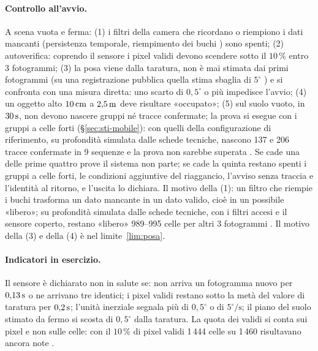 \paragraph{Controllo all'avvio.} A scena vuota e ferma: (1) i filtri della camera che ricordano o riempiono i dati mancanti (persistenza temporale, riempimento dei buchi \cite{realsense-filtri-post}) sono spenti; (2) autoverifica: coprendo il sensore i pixel validi devono scendere sotto il $10\,\%$ entro 3 fotogrammi; (3) la posa viene dalla taratura, non è mai stimata dai primi fotogrammi (su una registrazione pubblica \cite{tum-rgbd} quella stima sbaglia di $5^\circ$ ) e si confronta con una misura diretta: uno scarto di $0{,}5^\circ$ o più impedisce l'avvio; (4) un oggetto alto $10\,\mathrm{cm}$ a $2{,}5\,\mathrm{m}$ deve risultare «occupato»; (5) sul suolo vuoto, in $30\,\mathrm{s}$, non devono nascere gruppi né tracce confermate; la prova si esegue con i gruppi a celle forti (\S\ref{sec:sti-mobile}): con quelli della configurazione di riferimento, su profondità simulata dalle schede tecniche, nascono 137 e 206 tracce confermate in 9 sequenze e la prova non sarebbe superata . Se cade una delle prime quattro prove il sistema non parte; se cade la quinta restano spenti i gruppi a celle forti, le condizioni aggiuntive del riaggancio, l'avviso senza traccia e l'identità al ritorno, e l'uscita lo dichiara. Il motivo della (1): un filtro che riempie i buchi trasforma un dato mancante in un dato valido, cioè in un possibile «libero»; su profondità simulata dalle schede tecniche, con i filtri accesi e il sensore coperto, restano «libero» 989--995 celle per altri 3 fotogrammi . Il motivo della (3) e della (4) è nel limite~\ref{lim:posa}.

\paragraph{Indicatori in esercizio.} Il sensore è dichiarato non in salute se: non arriva un fotogramma nuovo per $0{,}13\,\mathrm{s}$ o ne arrivano tre identici; i pixel validi restano sotto la metà del valore di taratura per $0{,}2\,\mathrm{s}$; l'unità inerziale segnala più di $0{,}5^\circ$ o di $5^\circ/\mathrm{s}$; il piano del suolo stimato da fermo si scosta di $0{,}5^\circ$ dalla taratura. La quota dei validi si conta sui pixel e non sulle celle: con il $10\,\%$ di pixel validi 1\,444 celle su 1\,460 risultavano ancora note .

